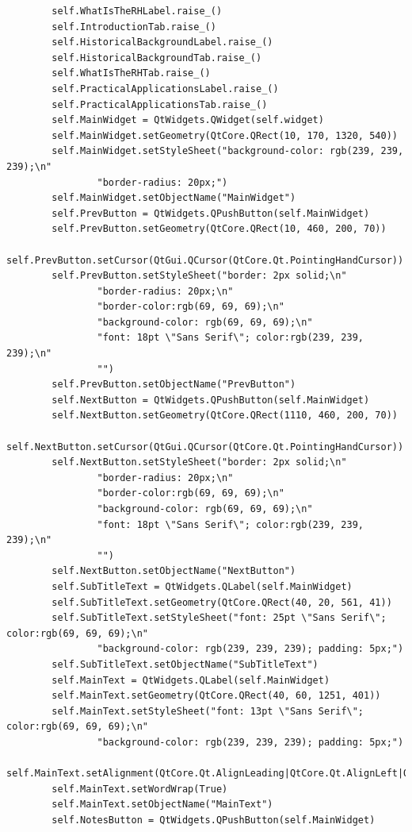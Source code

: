 \documentclass[12pt]{article}
\begin{document}
\begin{lstlisting}
        self.WhatIsTheRHLabel.raise_()
        self.IntroductionTab.raise_()
        self.HistoricalBackgroundLabel.raise_()
        self.HistoricalBackgroundTab.raise_()
        self.WhatIsTheRHTab.raise_()
        self.PracticalApplicationsLabel.raise_()
        self.PracticalApplicationsTab.raise_()
        self.MainWidget = QtWidgets.QWidget(self.widget)
        self.MainWidget.setGeometry(QtCore.QRect(10, 170, 1320, 540))
        self.MainWidget.setStyleSheet("background-color: rgb(239, 239, 239);\n"
                "border-radius: 20px;")
        self.MainWidget.setObjectName("MainWidget")
        self.PrevButton = QtWidgets.QPushButton(self.MainWidget)
        self.PrevButton.setGeometry(QtCore.QRect(10, 460, 200, 70))
        self.PrevButton.setCursor(QtGui.QCursor(QtCore.Qt.PointingHandCursor))
        self.PrevButton.setStyleSheet("border: 2px solid;\n"
                "border-radius: 20px;\n"
                "border-color:rgb(69, 69, 69);\n"
                "background-color: rgb(69, 69, 69);\n"
                "font: 18pt \"Sans Serif\"; color:rgb(239, 239, 239);\n"
                "")
        self.PrevButton.setObjectName("PrevButton")
        self.NextButton = QtWidgets.QPushButton(self.MainWidget)
        self.NextButton.setGeometry(QtCore.QRect(1110, 460, 200, 70))
        self.NextButton.setCursor(QtGui.QCursor(QtCore.Qt.PointingHandCursor))
        self.NextButton.setStyleSheet("border: 2px solid;\n"
                "border-radius: 20px;\n"
                "border-color:rgb(69, 69, 69);\n"
                "background-color: rgb(69, 69, 69);\n"
                "font: 18pt \"Sans Serif\"; color:rgb(239, 239, 239);\n"
                "")
        self.NextButton.setObjectName("NextButton")
        self.SubTitleText = QtWidgets.QLabel(self.MainWidget)
        self.SubTitleText.setGeometry(QtCore.QRect(40, 20, 561, 41))
        self.SubTitleText.setStyleSheet("font: 25pt \"Sans Serif\"; color:rgb(69, 69, 69);\n"
                "background-color: rgb(239, 239, 239); padding: 5px;")
        self.SubTitleText.setObjectName("SubTitleText")
        self.MainText = QtWidgets.QLabel(self.MainWidget)
        self.MainText.setGeometry(QtCore.QRect(40, 60, 1251, 401))
        self.MainText.setStyleSheet("font: 13pt \"Sans Serif\"; color:rgb(69, 69, 69);\n"
                "background-color: rgb(239, 239, 239); padding: 5px;")
        self.MainText.setAlignment(QtCore.Qt.AlignLeading|QtCore.Qt.AlignLeft|QtCore.Qt.AlignTop)
        self.MainText.setWordWrap(True)
        self.MainText.setObjectName("MainText")
        self.NotesButton = QtWidgets.QPushButton(self.MainWidget)

\end{lstlisting}
\end{document}
